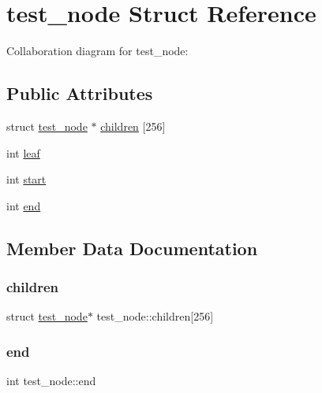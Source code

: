 \hypertarget{structtest__node}{}\section{test\+\_\+node Struct Reference}
\label{structtest__node}


Collaboration diagram for test\+\_\+node\+:
\subsection*{Public Attributes}
\begin{DoxyCompactItemize}
\item 
struct \hyperlink{structtest__node}{test\+\_\+node} $\ast$ \hyperlink{structtest__node_a78159a40a964a54f7abeb4cef896fcc2}{children} \mbox{[}256\mbox{]}
\item 
int \hyperlink{structtest__node_a2c46ffd93d63f06a29e2928cee863435}{leaf}
\item 
int \hyperlink{structtest__node_ae97568efab015dc1f2c6c727fb5da6cc}{start}
\item 
int \hyperlink{structtest__node_aa13ec5d5c3800e2afdd0c5f521a1dc0b}{end}
\end{DoxyCompactItemize}


\subsection{Member Data Documentation}
\mbox{\label{structtest__node_a78159a40a964a54f7abeb4cef896fcc2}} 
\subsubsection{\texorpdfstring{children}{children}}
{\footnotesize\ttfamily struct \hyperlink{structtest__node}{test\+\_\+node}$\ast$ test\+\_\+node\+::children\mbox{[}256\mbox{]}}

\mbox{\label{structtest__node_aa13ec5d5c3800e2afdd0c5f521a1dc0b}} 
\subsubsection{\texorpdfstring{end}{end}}
{\footnotesize\ttfamily int test\+\_\+node\+::end}

